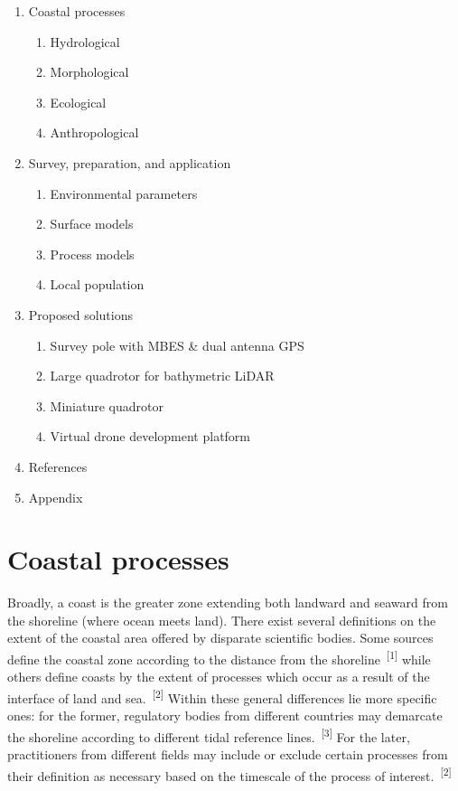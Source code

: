 \documentclass{article}
\begin{document}
\newpage
{}
\thispagestyle{fancy}
\begin{enumerate}
    \item{Coastal processes}
    \begin{enumerate}
        \item{Hydrological}
        \item{Morphological}
        \item{Ecological}
        \item{Anthropological}
    \end{enumerate}

    \item{Survey, preparation, and application}
    \begin{enumerate}
        \item{Environmental parameters}
        \item{Surface models}
        \item{Process models}
        \item{Local population}
    \end{enumerate}

    \item Proposed solutions
    \begin{enumerate}
        \item{Survey pole with MBES \& dual antenna GPS}
        \item{Large quadrotor for bathymetric LiDAR}
        \item{Miniature quadrotor}
        \item{Virtual drone development platform}
    \end{enumerate}

    \item{References}
    \item{Appendix}
\end{enumerate}

\newpage
{}
\fancyfoot[C]{\thepage} 
\thispagestyle{fancy}
\setcounter{page}{1}
\section{Coastal processes}
{\hspace{.5cm} Broadly, a coast is the greater zone extending both landward and seaward from the shoreline (where ocean meets land). There exist several definitions on the extent of the coastal area offered by disparate scientific bodies. Some sources define the coastal zone according to the distance from the shoreline~\textsuperscript{[1]} while others define coasts by the extent of processes which occur as a result of the interface of land and sea.~\textsuperscript{[2]} Within these general differences lie more specific ones: for the former, regulatory bodies from different countries may demarcate the shoreline according to different tidal reference lines.~\textsuperscript{[3]} For the later, practitioners from different fields may include or exclude certain processes from their definition as necessary based on the timescale of the process of interest.~\textsuperscript{[2]} \par}
\end{document}
